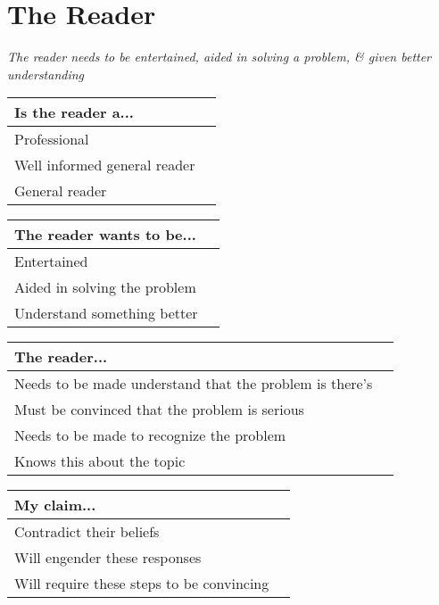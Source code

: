 \documentclass[10pt, a4paper]{article}
\begin{document}
\section{The Reader}
\emph{The reader needs to be entertained, aided in solving a problem, \& given better understanding}
\begin{center}
	\begin{tabular}{|l |l|}
		\hline
		Is the reader a... &\\
		\hline
		Professional &\\
		\hline
		Well informed general reader&\\
		\hline
		General reader &\\
		\hline
	\end{tabular}
\end{center}
\begin{center}
	\begin{tabular}{|l |l|}
		\hline
		The reader wants to be... &\\
		\hline
		Entertained&\\
		\hline
		Aided in solving the problem&\\ 
		\hline
		Understand something better &\\
		\hline
	\end{tabular}
\end{center}
\begin{center}
	\begin{tabular}{|l |l|}
		\hline
		The reader...&\\
		\hline
		Needs to be made understand that the problem is there's&\\
		\hline
		Must be convinced that the problem is serious&\\ 
		\hline
		Needs to be made to recognize the problem&\\
		\hline
		Knows this about the topic&\\
		\hline
	\end{tabular}
\end{center}
\begin{center}
	\begin{tabular}{|l |l|}
		\hline
		My claim...&\\
		\hline
		Contradict their beliefs&\\
		\hline
		Will engender these responses&\\
		\hline
		Will require these steps to be convincing&\\
		\hline
	\end{tabular}
\end{center}




\end{document}
